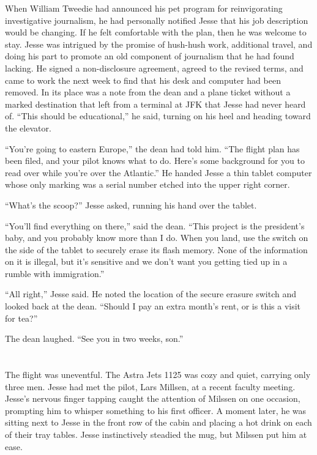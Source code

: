 \documentclass[12pt]{book}
\begin{document}
When William Tweedie had announced his pet program for reinvigorating investigative journalism, he had personally notified Jesse that his job description would be changing.  If he felt comfortable with the plan, then he was welcome to stay.  Jesse was intrigued by the promise of hush-hush work, additional travel, and doing his part to promote an old component of journalism that he had found lacking.  He signed a non-disclosure agreement, agreed to the revised terms, and came to work the next week to find that his desk and computer had been removed.  In its place was a note from the dean and a plane ticket without a marked destination that left from a terminal at JFK that Jesse had  never heard of.  ``This should be educational,'' he said, turning on his heel and heading toward the elevator.

``You're going to eastern Europe,'' the dean had told him.  ``The flight plan has been filed, and your pilot knows what to do.  Here's some background for you to read over while you're over the Atlantic.''  He handed Jesse a thin tablet computer whose only marking was a serial number etched into the upper right corner.

``What's the scoop?'' Jesse asked, running his hand over the tablet.

``You'll find everything on there,'' said the dean.  ``This project is the president's baby, and you probably know more than I do.  When you land, use the switch on the side of the tablet to securely erase its flash memory.  None of the information on it is illegal, but it's sensitive and we don't want you getting tied up in a rumble with immigration.''

``All right,'' Jesse said.  He noted the location of the secure erasure switch and looked back at the dean.  ``Should I pay an extra month's rent, or is this a visit for tea?''

The dean laughed.  ``See you in two weeks, son.''

\chapter{}

The flight was uneventful.  The Astra Jets 1125 was cozy and quiet, carrying only three men.  Jesse had met the pilot, Lars Millsen, at a recent faculty meeting.  Jesse's nervous finger tapping caught the attention of Milssen on one occasion, prompting him to whisper something to his first officer.  A moment later, he was sitting next to Jesse in the front row of the cabin and placing a hot drink on each of their tray tables.  Jesse instinctively steadied the mug, but Milssen put him at ease.
\end{document}
